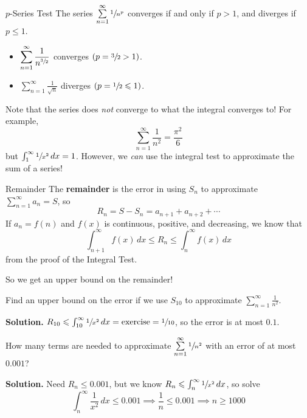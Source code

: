 \begin{Theorem}{$ p $-Series Test}{}
    The series $ \sum\limits_{n=1}^{\infty} \sfrac{1}{n^p}  $ converges
    if and only if $ p>1 $, and diverges if $ p\leqslant 1 $.
\end{Theorem}

\begin{Example}{}{}
    \begin{itemize}
        \item $ \displaystyle \sum\limits_{n=1}^{\infty} \frac{1}{n^{\sfrac{3}{2} }} $
              converges $\left( p=\sfrac{3}{2} >1 \right)$.
        \item $ \displaystyle \sum\limits_{n=1}^{\infty} \frac{1}{\sqrt{n}} $
              diverges $\left( p=\sfrac{1}{2} \leqslant 1 \right)$.
    \end{itemize}
\end{Example}

\begin{Remark}{}{}
    Note that the series does \emph{not} converge to what the integral converges to! For example,
    \[ \sum\limits_{n=1}^{\infty} \frac{1}{n^2} =\frac{\pi^2}{6} \]
    but $ \int_{1}^{\infty} \sfrac{1}{x^2} \, d{x}=1$. However, we \emph{can} use the integral
    test to approximate the sum of a series!
\end{Remark}

\begin{Definition}{Remainder}{}
    The \textbf{remainder} is the error in using $ S_n $ to approximate $ \sum\limits_{n=1}^{\infty} a_n=S $,
    so
    \[ R_n=S-S_n=a_{n+1}+a_{n+2}+\cdots \]
    If $ a_n=f(n) $ and $ f(x) $ is continuous, positive, and decreasing, we know that
    \[ \int_{n+1}^{\infty} f(x)\, d{x} \leqslant R_n\leqslant \int_{n}^{\infty} f(x)\, d{x} \]
    from the proof of the Integral Test.
\end{Definition}
So we get an upper bound on the remainder!

\begin{Example}{}{}
    Find an upper bound on the error if we use $ S_{10} $ to approximate
    $ \displaystyle\sum\limits_{n=1}^{\infty} \frac{1}{n^2}  $.

    \textbf{Solution.} $ R_{10}\leqslant \int_{10}^{\infty}\sfrac{1}{x^2}  \, d{x}=
        \text{exercise}=\sfrac{1}{10} $, so the error is at most $ 0.1 $.
\end{Example}

\begin{Example}{}{}
    How many terms are needed to approximate $ \sum\limits_{n=1}^{\infty} \sfrac{1}{n^2}  $
    with an error of at most $ 0.001 $?

    \textbf{Solution.} Need $ R_n\leqslant 0.001 $, but we know $ R_n\leqslant \int_{n}^{\infty}
        \sfrac{1}{x^2} \, d{x} $, so solve
    \[ \int_{n}^{\infty} \frac{1}{x^2} \, d{x} \leqslant 0.001\implies
        \frac{1}{n} \leqslant 0.001\implies n\geqslant 1000 \]
\end{Example}

